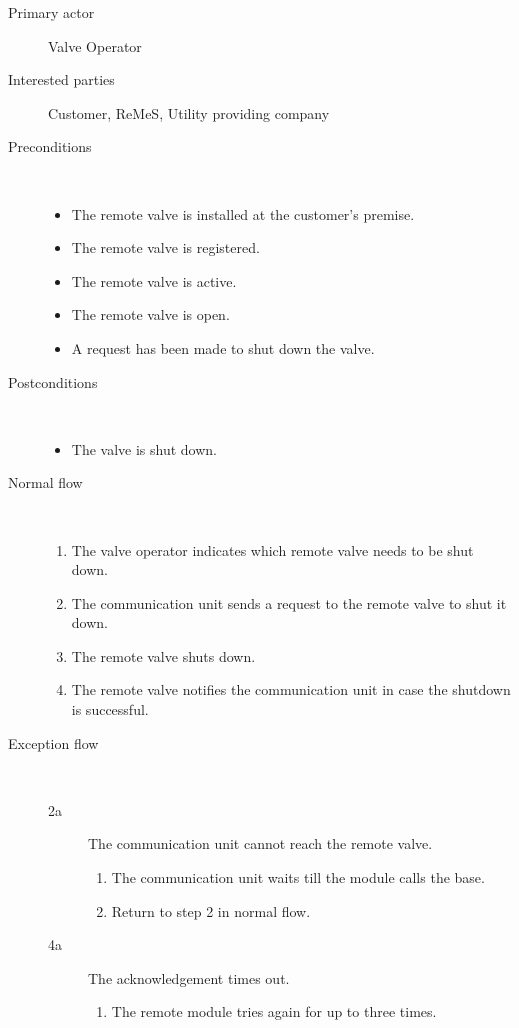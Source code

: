 \begin{description}
	\item[Primary actor] Valve Operator
	\item[Interested parties] Customer, ReMeS, Utility providing company
	\item[Preconditions] \ 
	\begin{itemize}
		\item The remote valve is installed at the customer's premise.
		\item The remote valve is registered.
		\item The remote valve is active.
		\item The remote valve is open.
		\item A request has been made to shut down the valve.
	\end{itemize}
	\item[Postconditions] \ 
	\begin{itemize}
		\item The valve is shut down.
	\end{itemize}
	\item[Normal flow] \ 
	\begin{enumerate}
	  	\item The valve operator indicates which remote valve needs to be shut down.
	  	\item The communication unit sends a request to the remote valve to shut it
	  	down.
	  	\item The remote valve shuts down.
	  	\item The remote valve notifies the communication unit in case the
	  	shutdown is successful.
	\end{enumerate}
	\item[Exception flow] \ 
	\begin{description}
		\item[2a] The communication unit cannot reach the remote valve.
		\begin{enumerate}
		  \item The communication unit waits till the module calls the base.
		  \item Return to step 2 in normal flow.
		\end{enumerate}
		\item[4a] The acknowledgement times out.
		\begin{enumerate}
			\item The remote module tries again for up to three times.
		\end{enumerate}
	\end{description}
\end{description}